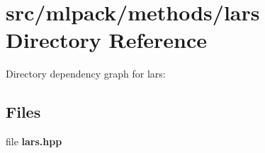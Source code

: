 \section{src/mlpack/methods/lars Directory Reference}
\label{dir_eca2487ea0982c86d2063306258b0ceb}
Directory dependency graph for lars\-:
\subsection*{Files}
\begin{DoxyCompactItemize}
\item 
file {\bf lars.\-hpp}
\end{DoxyCompactItemize}
